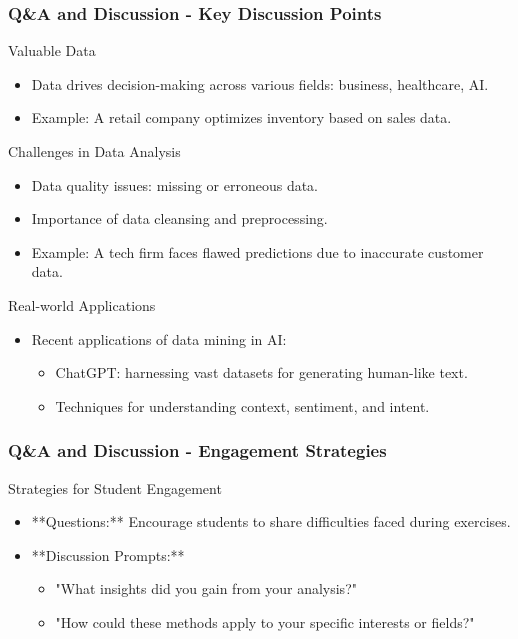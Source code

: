 \documentclass[aspectratio=169]{beamer}
\begin{document}
\begin{frame}[fragile]
    \frametitle{Q\&A and Discussion - Key Discussion Points}
    \begin{block}{Valuable Data}
    \begin{itemize}
        \item Data drives decision-making across various fields: business, healthcare, AI.
        \item Example: A retail company optimizes inventory based on sales data.
    \end{itemize}
    \end{block}

    \begin{block}{Challenges in Data Analysis}
    \begin{itemize}
        \item Data quality issues: missing or erroneous data.
        \item Importance of data cleansing and preprocessing.
        \item Example: A tech firm faces flawed predictions due to inaccurate customer data.
    \end{itemize}
    \end{block}
    
    \begin{block}{Real-world Applications}
    \begin{itemize}
        \item Recent applications of data mining in AI:
        \begin{itemize}
            \item ChatGPT: harnessing vast datasets for generating human-like text.
            \item Techniques for understanding context, sentiment, and intent.
        \end{itemize}
    \end{itemize}
    \end{block}
\end{frame}

\begin{frame}[fragile]
    \frametitle{Q\&A and Discussion - Engagement Strategies}
    \begin{block}{Strategies for Student Engagement}
    \begin{itemize}
        \item **Questions:** Encourage students to share difficulties faced during exercises.
        \item **Discussion Prompts:**
        \begin{itemize}
            \item "What insights did you gain from your analysis?"
            \item "How could these methods apply to your specific interests or fields?"
        \end{itemize}
    \end{itemize}
    \end{block}
\end{frame}
\end{document}
